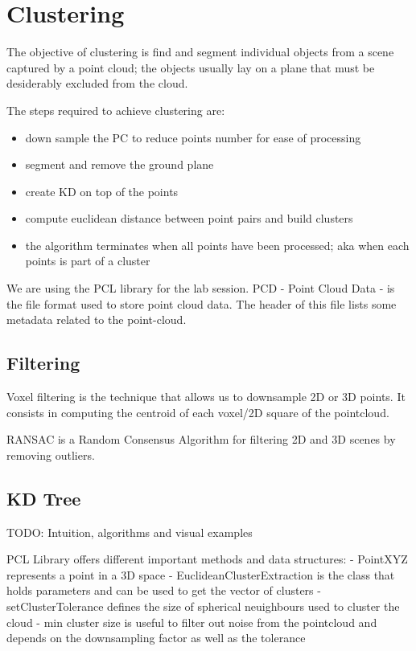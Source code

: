 \chapter{Clustering}
The objective of clustering is find and segment individual objects from a scene captured by a point cloud;
the objects usually lay on a plane that must be desiderably excluded from the cloud. 

The steps required to achieve clustering are:
\begin{itemize}
  \item down sample the PC to reduce points number for ease of processing
  \item segment and remove the ground plane
  \item create KD on top of the points
  \item compute euclidean distance between point pairs and build clusters
  \item the algorithm terminates when all points have been processed; aka when each points is part of a cluster
\end{itemize}

We are using the PCL library for the lab session.
PCD - Point Cloud Data - is the file format used to store point cloud data.
The header of this file lists some metadata related to the point-cloud.

\section{Filtering}
Voxel filtering is the technique that allows us to downsample 2D or 3D points.
It consists in computing the centroid of each voxel/2D square of the pointcloud.

RANSAC is a Random Consensus Algorithm for filtering 2D and 3D scenes by removing outliers.

\section{KD Tree}
TODO: Intuition, algorithms and visual examples

PCL Library offers different important methods and data structures:
- PointXYZ represents a point in a 3D space
- EuclideanClusterExtraction is the class that holds parameters and can be used to get the vector of clusters
- setClusterTolerance defines the size of spherical neuighbours used to cluster the cloud
- min cluster size is useful to filter out noise from the pointcloud and depends on the downsampling factor as well as the tolerance

